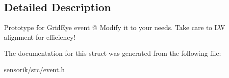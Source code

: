 \subsection{Detailed Description}
Prototype for Grid\+Eye event @ Modify it to your needs. Take care to LW alignment for efficiency! 

The documentation for this struct was generated from the following file\+:\begin{DoxyCompactItemize}
\item 
sensorik/src/event.\+h\end{DoxyCompactItemize}
